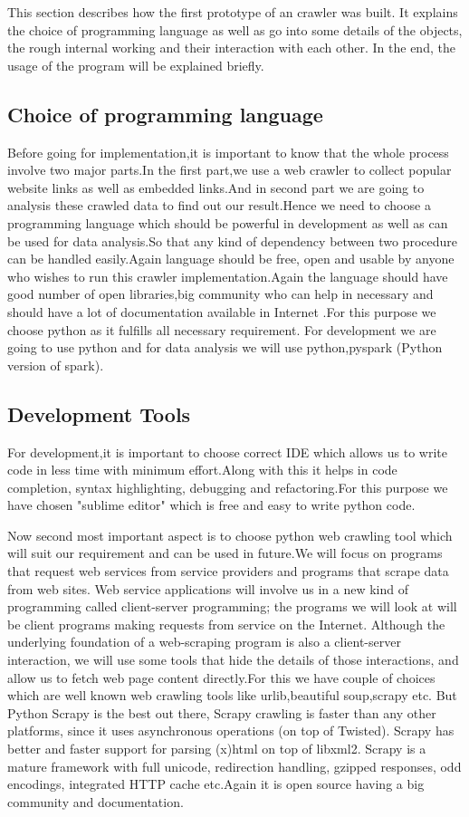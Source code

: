 This section describes how the first prototype of an crawler was built. It explains the
choice of programming language as well as go into some details of the objects, the rough internal working and their interaction with each other. In the end, the usage of the program will be explained briefly.

\subsection{Choice of programming language}
Before going for implementation,it is important to know that the whole process involve two major parts.In the first part,we use a web crawler to collect popular website links as well as embedded links.And in second part we are going to analysis these crawled data to find out our result.Hence we need to choose a programming language which should be powerful in development as well as can be used for data analysis.So that any kind of dependency between two procedure can be handled easily.Again language should be free, open and usable by anyone who wishes to run this crawler implementation.Again the language should have good number of open libraries,big community who can help in necessary and should have a lot of documentation available in Internet .For this purpose we choose python as it fulfills all necessary requirement. For development we are going to use python and for data analysis we will use python,pyspark (Python version of spark).

\subsection{Development Tools}
For development,it is important to choose correct IDE which allows us to write code in less time with minimum effort.Along with this it helps in code completion, syntax highlighting, debugging and refactoring.For this purpose we have chosen "sublime editor" which is free and easy to write python code.

Now second most important aspect is to choose python web crawling tool which will suit our requirement and can be used in future.We will focus on programs that request web services from service providers and programs that scrape data from web sites. Web service applications will involve us in a new kind of programming called client-server programming; the programs we will look at will be client programs making requests from service on the Internet. Although the underlying foundation of a web-scraping program is also a client-server interaction, we will use some tools that hide the details of those interactions, and allow us to fetch web page content directly.For this we have couple of choices which are well known web crawling tools like urlib,beautiful soup,scrapy etc. But Python Scrapy is the best out there, Scrapy crawling is faster than any other platforms, since it uses asynchronous operations (on top of Twisted). Scrapy has better and faster support for parsing (x)html on top of libxml2. Scrapy is a mature framework with full unicode, redirection handling, gzipped responses, odd encodings, integrated HTTP cache etc.Again it is open source having a big community and documentation.

